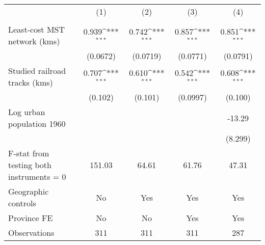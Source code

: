 {
\def\sym#1{\ifmmode^{#1}\else\(^{#1}\)\fi}
\begin{tabular}{l*{4}{c}}
\hline\hline
                &\multicolumn{1}{c}{(1)}&\multicolumn{1}{c}{(2)}&\multicolumn{1}{c}{(3)}&\multicolumn{1}{c}{(4)}\\
                &\multicolumn{1}{c}{}&\multicolumn{1}{c}{}&\multicolumn{1}{c}{}&\multicolumn{1}{c}{}\\
\hline
Least-cost MST network (kms)&    0.939\sym{***}&    0.742\sym{***}&    0.857\sym{***}&    0.851\sym{***}\\
                & (0.0672)         & (0.0719)         & (0.0771)         & (0.0791)         \\
[1em]
Studied railroad tracks (kms)&    0.707\sym{***}&    0.610\sym{***}&    0.542\sym{***}&    0.608\sym{***}\\
                &  (0.102)         &  (0.101)         & (0.0997)         &  (0.100)         \\
[1em]
Log urban population 1960&                  &                  &                  &   -13.29         \\
                &                  &                  &                  &  (8.299)         \\
\hline
F-stat from testing both instruments = 0&   151.03         &    64.61         &    61.76         &    47.31         \\
Geographic controls&       No         &      Yes         &      Yes         &      Yes         \\
Province FE     &       No         &       No         &      Yes         &      Yes         \\
Observations    &      311         &      311         &      311         &      287         \\
\hline\hline
\end{tabular}
}
